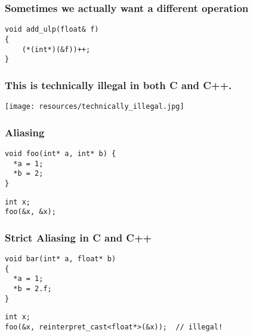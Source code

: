 \documentclass[aspectratio=169]{beamer}
\newif\iftransitions
\begin{document}
\begin{frame}[fragile]

  \frametitle{Sometimes we actually want a different operation}
  
  \begin{lstlisting}
void add_ulp(float& f)
{
    (*(int*)(&f))++;
}
  \end{lstlisting}
\end{frame}

\begin{frame}
  \frametitle{This is technically illegal in both C and C++.}

  \begin{center}
  \texttt{[image: resources/technically\_illegal.jpg]}
  \end{center}
\end{frame}


\begin{frame}[fragile]
  \frametitle{Aliasing}

  \iftransitions \pause \fi



  \begin{lstlisting}
void foo(int* a, int* b) {
  *a = 1;
  *b = 2;
}
  \end{lstlisting}
  \iftransitions \pause \fi
  \begin{lstlisting}
int x;
foo(&x, &x);
  \end{lstlisting}




\end{frame}


\begin{frame}[fragile]
  \frametitle{Strict Aliasing in C and C++}


  
  \begin{lstlisting}
void bar(int* a, float* b)
{
  *a = 1;
  *b = 2.f;
}
  \end{lstlisting}
  \begin{lstlisting}
int x;
foo(&x, reinterpret_cast<float*>(&x));  // illegal!
  \end{lstlisting}
  
\end{frame}
\end{document}
